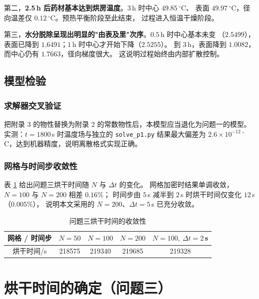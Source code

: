 \documentclass[12pt,a4paper]{ctexart}
\begin{document}
第二，\textbf{2.5\,h 后药材基本达到烘房温度}。$3$\,h 时中心 $49.85\,^\circ$C、
表面 $49.97\,^\circ$C，径向温差仅 $0.12\,^\circ$C。预热平衡阶段至此结束，
过程进入恒温干燥阶段。

第三，\textbf{水分脱除呈现出明显的"由表及里"次序}。$0.5$\,h 时中心基本未变
（$2.5499$），表面已降到 $1.6491$；$1$\,h 时中心才开始下降（$2.5255$）。
到 $3$\,h，表面降到 $1.0082$，而中心仍有 $1.7663$，径向梯度很大。
这说明过程始终由内部扩散控制。

\subsection{模型检验}
\label{sec:p23-verify}

\subsubsection{求解器交叉验证}

把附录 3 的物性替换为附录 2 的常数物性后，本模型应当退化为问题一的模型。
实测：$t=1800$\,s 时温度场与独立的 \texttt{solve\_p1.py} 结果最大偏差为
$2.6\times10^{-12}\,^\circ$C，达到机器精度，说明离散格式实现正确。

\subsubsection{网格与时间步收敛性}

表 \ref{tab:p23-conv} 给出问题三烘干时间随 $N$ 与 $\Delta t$ 的变化。
网格加密时结果单调收敛，$N=100$ 与 $N=200$ 相差 $0.16\%$；
时间步由 $5$\,s 减半到 $2$\,s 时烘干时间仅变化 $12$\,s（$0.005\%$），
说明本文采用的 $N=200$、$\Delta t=5$\,s 已充分收敛。

\begin{table}[htbp]
  \centering
  \caption{问题三烘干时间的收敛性}
  \label{tab:p23-conv}
  \small
  \begin{tabular}{ccccc}
    \toprule
    网格 / 时间步 & $N=50$ & $N=100$ & $N=200$ & $N=100,\ \Delta t=2$\,s \\
    \midrule
    烘干时间/s & 218575 & 219340 & 219685 & 219328 \\
    \bottomrule
  \end{tabular}
\end{table}

\section{烘干时间的确定（问题三）}
\end{document}
